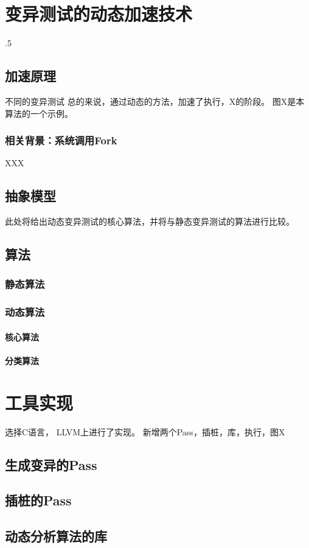 \documentclass[nofonts]{ctexrep}
\begin{document}
\chapter{ 变异测试的动态加速技术}.5
\section{加速原理}
不同的变异测试
总的来说，通过动态的方法，加速了执行，X的阶段。
图X是本算法的一个示例。
\subsection{相关背景：系统调用Fork}
XXX
\section{抽象模型}
此处将给出动态变异测试的核心算法，并将与静态变异测试的算法进行比较。
\section{算法}
\subsection{静态算法}
\subsection{动态算法}
\subsubsection{核心算法}
\subsubsection{分类算法}

\chapter{工具实现} 
选择C语言，
LLVM上进行了实现。
新增两个Pass，插桩，库，执行，图X
\section{生成变异的Pass}
\section{插桩的Pass}
\section{动态分析算法的库}
\end{document}
